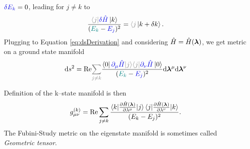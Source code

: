 $\textcolor{blue}{\delta E_k}=0$, leading for $j\neq k$ to
\begin{equation}
    \frac{\textcolor{gray}{\bra{j}}\textcolor{blue}{\delta \HH}\ket{k}}{(\textcolor{teal}{E_k}-\textcolor{blue}{E_j})^2}=\textcolor{gray}{\langle j}\ket{k+\delta k}.
    \label{eq:braket_k,deltaj}
\end{equation}
Plugging to Equation \ref{eq:dsDerivation} and considering $\hat{H}=\hat{H}({\bm\lambda})$, we get metric on a ground state manifold
\begin{equation}
    \d s^2 = \Re\textcolor{gray}{\sum_{j\neq k}} \frac{\bra{0}\textcolor{blue}{\partial_\mu \HH \textcolor{gray}{\ket{j}}}\textcolor{gray}{\bra{j}}\textcolor{blue}{\partial_\nu \HH}\ket{0}}{(\textcolor{teal}{E_k}-\textcolor{blue}{E_j})^2}  \d \llambda^\mu\d \llambda^\nu
    \label{eq:distanceonM}
\end{equation}


Definition of the k--state manifold is then
\begin{equation}
    g_{\mu\nu}^{(k)} = \text{Re} \sum_{j\neq k}\frac{\braket{k|\frac{\partial \hat{H}({\bm\lambda})}{\partial \lambda^\mu}|j}\braket{j|\frac{\partial \hat{H}({\bm\lambda})}{\partial \lambda^\nu}|k}}{(E_k-E_j)^2}.
    \label{eq:metrictensork}
\end{equation}
The Fubini-Study metric on the eigenstate manifold is sometimes called \emph{Geometric tensor}. 
